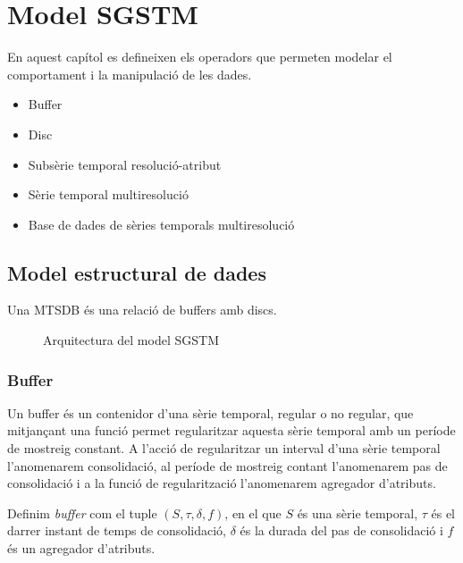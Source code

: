 \chapter{Model SGSTM}


En aquest capítol es defineixen els operadors que permeten modelar el comportament i la manipulació de les dades.



\begin{itemize}
\item Buffer
\item Disc
\item Subsèrie temporal resolució-atribut
\item Sèrie temporal multiresolució
\item Base de dades de sèries temporals multiresolució
\end{itemize}







\section{Model estructural de dades}

Una MTSDB és una relació de buffers amb discs. 


\begin{figure}[tp]
\centering

\caption{Arquitectura del model SGSTM}
\label{fig:model:bdstm}
\end{figure}


\subsection{Buffer}\label{sec:model:buffer}

Un buffer és un contenidor d'una sèrie temporal, regular o no regular, que mitjançant una funció permet regularitzar aquesta sèrie temporal amb un període de mostreig constant. A l'acció de regularitzar un interval d'una sèrie temporal l'anomenarem consolidació, al període de mostreig contant l'anomenarem pas de consolidació i a la funció de regularització l'anomenarem agregador d'atributs.

\begin{definition}[Buffer]
  Definim \emph{buffer} com el tuple $(S,\tau,\delta,f)$, en el que
  $S$ és una sèrie temporal, $\tau$ és el darrer instant de temps de
  consolidació, $\delta$ és la durada del pas de consolidació i $f$ és
  un agregador d'atributs.
\end{definition}

